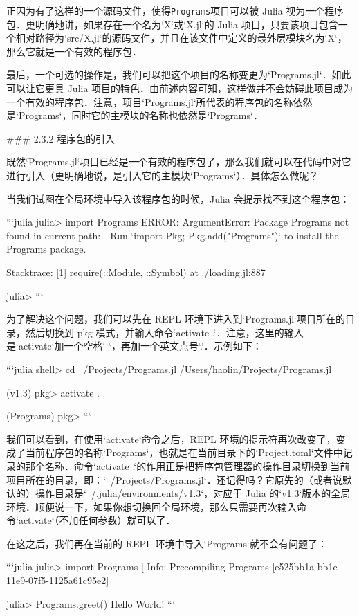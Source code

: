 正因为有了这样的一个源码文件，使得\verb|Programs|项目可以被 Julia 视为一个程序包．更明确地讲，如果存在一个名为`X`或`X.jl`的 Julia 项目，只要该项目包含一个相对路径为`src/X.jl`的源码文件，并且在该文件中定义的最外层模块名为`X`，那么它就是一个有效的程序包．

最后，一个可选的操作是，我们可以把这个项目的名称变更为`Programs.jl`．如此可以让它更具 Julia 项目的特色．由前述内容可知，这样做并不会妨碍此项目成为一个有效的程序包．注意，项目`Programs.jl`所代表的程序包的名称依然是`Programs`，同时它的主模块的名称也依然是`Programs`．

### 2.3.2 程序包的引入

既然`Programs.jl`项目已经是一个有效的程序包了，那么我们就可以在代码中对它进行引入（更明确地说，是引入它的主模块`Programs`）．具体怎么做呢？

当我们试图在全局环境中导入该程序包的时候，Julia 会提示找不到这个程序包：

```julia
julia> import Programs
ERROR: ArgumentError: Package Programs not found in current path:
- Run `import Pkg; Pkg.add("Programs")` to install the Programs package.

Stacktrace:
 [1] require(::Module, ::Symbol) at ./loading.jl:887

julia> 
```

为了解决这个问题，我们可以先在 REPL 环境下进入到`Programs.jl`项目所在的目录，然后切换到 pkg 模式，并输入命令`activate .`．注意，这里的输入是`activate`加一个空格` `，再加一个英文点号`.`．示例如下：

```julia
shell> cd ~/Projects/Programs.jl
/Users/haolin/Projects/Programs.jl

(v1.3) pkg> activate .

(Programs) pkg> 
```

我们可以看到，在使用`activate`命令之后，REPL 环境的提示符再次改变了，变成了当前程序包的名称`Programs`，也就是在当前目录下的`Project.toml`文件中记录的那个名称．命令`activate .`的作用正是把程序包管理器的操作目录切换到当前项目所在的目录，即：`~/Projects/Programs.jl`．还记得吗？它原先的（或者说默认的）操作目录是`~/.julia/environments/v1.3`，对应于 Julia 的`v1.3`版本的全局环境．顺便说一下，如果你想切换回全局环境，那么只需要再次输入命令`activate`（不加任何参数）就可以了．

在这之后，我们再在当前的 REPL 环境中导入`Programs`就不会有问题了：

```julia
julia> import Programs
[ Info: Precompiling Programs [e525bb1a-bb1e-11e9-07f5-1125a61c95e2]

julia> Programs.greet()
Hello World!
```

